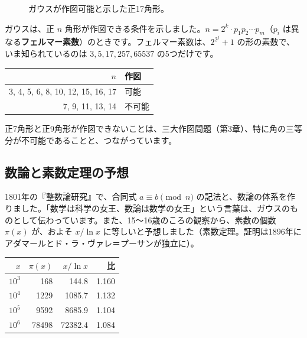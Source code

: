 \documentclass[a4paper,11pt,openany]{ltjsbook}
\begin{document}
\begin{figure}[htbp]
\centering
{}
\caption{ガウスが作図可能と示した正17角形。}
\end{figure}

ガウスは、正 $n$ 角形が作図できる条件を示しました。$n=2^k\cdot p_1p_2\cdots p_m$（$p_i$ は異なる\textbf{フェルマー素数}）のときです。フェルマー素数は、$2^{2^j}+1$ の形の素数で、いま知られているのは $3,5,17,257,65537$ の5つだけです。

\begin{center}
\begin{tabular}{rl}
\toprule
$n$ & 作図 \\
\midrule
3, 4, 5, 6, 8, 10, 12, 15, 16, 17 & 可能\\
7, 9, 11, 13, 14 & 不可能\\
\bottomrule
\end{tabular}
\end{center}

正7角形と正9角形が作図できないことは、三大作図問題（第3章）、特に角の三等分が不可能であることと、つながっています。

\subsection{数論と素数定理の予想}

1801年の『整数論研究』で、合同式 $a\equiv b\pmod n$ の記法と、数論の体系を作りました。「数学は科学の女王、数論は数学の女王」という言葉は、ガウスのものとして伝わっています。また、15〜16歳のころの観察から、素数の個数 $\pi(x)$ が、およそ $x/\ln x$ に等しいと予想しました（素数定理。証明は1896年にアダマールとド・ラ・ヴァレ＝プーサンが独立に）。

\begin{center}
\begin{tabular}{rrrr}
\toprule
$x$ & $\pi(x)$ & $x/\ln x$ & 比\\
\midrule
$10^3$ & 168 & 144.8 & 1.160\\
$10^4$ & 1229 & 1085.7 & 1.132\\
$10^5$ & 9592 & 8685.9 & 1.104\\
$10^6$ & 78498 & 72382.4 & 1.084\\
\bottomrule
\end{tabular}
\end{center}
\end{document}

